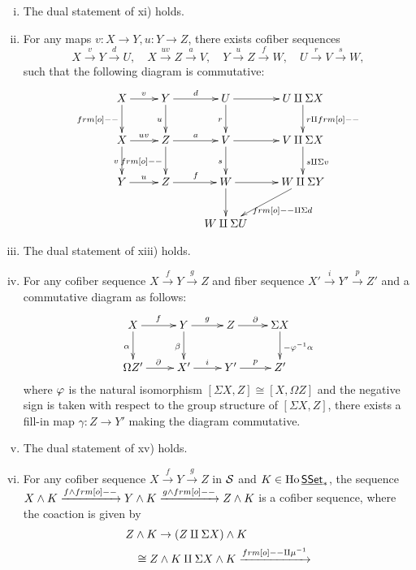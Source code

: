 {\begin{enumerate}[i)]
    $$\xymatrix{
    X\ar[r]^f\ar[d]_\alpha&Y\ar[r]^g\ar[d]_\beta&Z\\
    X'\ar[r]^{f'}&Y'\ar[r]^{g'}&Z'
    }$$
    where the two rows are cofiber sequences, there exists a map $\gamma:Z\to Z'$ making the following diagram commutative:
    $$\xymatrix{
    X\ar[r]^f\ar[d]_\alpha&Y\ar[r]^g\ar[d]_\beta&Z\ar[r]\ar[d]_\gamma&Z\amalg\Sigma X\ar[d]^{\gamma\amalg\Sigma\alpha}\\
    X'\ar[r]^{f'}&Y'\ar[r]^{g'}&Z'\ar[r]&Z'\amalg\Sigma X'
    }$$
    \item The dual statement of xi) holds.
    \item For any maps $v:X\to Y,u:Y\to Z$, there exists cofiber sequences
    $$X\xrightarrow{v}Y\xrightarrow{d}U,\quad X\xrightarrow{uv}Z\xrightarrow{a}V,\quad Y\xrightarrow{u}Z\xrightarrow{f}W,\quad 
    U\xrightarrow{r}V\xrightarrow{s}W,$$
    such that the following diagram is commutative:
    $$\xymatrix{
    X\ar[r]^v\ar[d]_{\1}&Y\ar[r]^d\ar[d]_u&U\ar[r]\ar[d]_r&U\amalg\Sigma X\ar[d]^{r\amalg\1}\\
    X\ar[r]^{uv}\ar[d]_v&Z\ar[r]^a\ar[d]_{\1}&V\ar[r]\ar[d]_s&V\amalg\Sigma X\ar[d]^{s\amalg\Sigma v}\\
    Y\ar[r]^u&Z\ar[r]^f&W\ar[r]\ar[d]&W\amalg\Sigma Y\ar[ld]^{\1\amalg\Sigma d}\\
    &&W\amalg\Sigma U&
    }$$
    \item The dual statement of xiii) holds.
    \item For any cofiber sequence $X\xrightarrow{f}Y\xrightarrow{g}Z$ and fiber sequence $X'\xrightarrow{i}Y'\xrightarrow{p}Z'$ 
    and a commutative diagram as follows:
    $$\xymatrix{
    X\ar[r]^f\ar[d]_\alpha&Y\ar[r]^g\ar[d]_\beta&Z\ar[r]^\p&\Sigma X\ar[d]^{-\vp^{-1}\alpha}\\
    \Omega Z'\ar[r]^\p&X'\ar[r]^i&Y'\ar[r]^p&Z'
    }$$
    where $\vp$ is the natural isomorphism $[\Sigma X,Z]\cong[X,\Omega Z]$ and the negative sign is taken with respect to the group structure 
    of $[\Sigma X,Z]$, there exists a fill-in map $\gamma:Z\to Y'$ making the diagram commutative.
    \item The dual statement of xv) holds.
    \item For any cofiber sequence $X\xrightarrow{f}Y\xrightarrow{g}Z$ in $\catS$ and $K\in\Ho\cat{SSet}_*$, the sequence 
    $X\ov K\xrightarrow{f\ov\1}Y\ov K\xrightarrow{g\ov\1}Z\ov K$ is a cofiber sequence, where the coaction is given by
    $$\begin{aligned}&Z\ov K\to(Z\amalg\Sigma X)\ov K\\&\hspace{0.8em}\cong Z\ov K\amalg\Sigma X\ov K\xrightarrow{\1\amalg\mu^{-1}}

\end{aligned}$$
\end{enumerate}}

